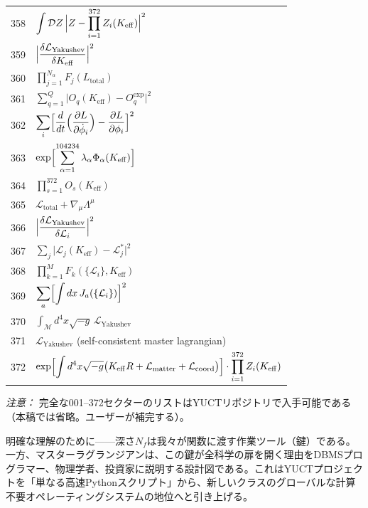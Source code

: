 \documentclass[11pt,a4paper]{article}
\begin{document}
\begin{longtable}{r p{}}
	358 & \(\displaystyle \int\mathcal{D}Z\,\Bigl|Z - \prod_{i=1}^{372}Z_i(K_{\mathrm{eff}})\Bigr|^2\) \\
	359 & \(\displaystyle \Bigl|\frac{\delta\mathcal{L}_{\text{Yakushev}}}{\delta K_{\mathrm{eff}}}\Bigr|^2\) \\
	360 & \(\displaystyle \prod_{j=1}^{N_\alpha}F_j(L_{\text{total}})\) \\
	361 & \(\displaystyle \sum_{q=1}^Q\bigl|O_q(K_{\mathrm{eff}}) - O_q^{\text{exp}}\bigr|^2\) \\
	362 & \(\displaystyle \sum_i\Bigl[\frac{d}{dt}\Bigl(\frac{\partial L}{\partial\dot\phi_i}\Bigr) - \frac{\partial L}{\partial\phi_i}\Bigr]^2\) \\
	363 & \(\displaystyle \exp\Bigl[\sum_{\alpha=1}^{104234}\lambda_\alpha\Phi_\alpha(K_{\mathrm{eff}})\Bigr]\) \\
	364 & \(\displaystyle \prod_{s=1}^{372}O_s(K_{\mathrm{eff}})\) \\
	365 & \(\displaystyle \mathcal{L}_{\text{total}} + \nabla_\mu\Lambda^\mu\) \\
	366 & \(\displaystyle \Bigl|\frac{\delta\mathcal{L}_{\text{Yakushev}}}{\delta\mathcal{L}_i}\Bigr|^2\) \\
	367 & \(\displaystyle \sum_j\bigl|\mathcal{L}_j(K_{\mathrm{eff}}) - \mathcal{L}_j^*\bigr|^2\) \\
	368 & \(\displaystyle \prod_{k=1}^M F_k(\{\mathcal{L}_i\},K_{\mathrm{eff}})\) \\
	369 & \(\displaystyle \sum_a\Bigl[\int dx\,J_a(\{\mathcal{L}_i\})\Bigr]^2\) \\
	370 & \(\displaystyle \int_{\mathcal{M}} d^4x\sqrt{-g}\,\mathcal{L}_{\text{Yakushev}}\) \\
	371 & \(\displaystyle \mathcal{L}_{\text{Yakushev}}\) (self-consistent master lagrangian) \\
	372 & \(\displaystyle \exp\Bigl[\int d^4x\sqrt{-g}\bigl(K_{\mathrm{eff}}R + \mathcal{L}_{\text{matter}} + \mathcal{L}_{\text{coord}}\bigr)\Bigr]\cdot\prod_{i=1}^{372}Z_i(K_{\mathrm{eff}})\) \\
	
\end{longtable}
	
	\textit{注意：} 完全な001–372セクターのリストはYUCTリポジトリで入手可能である（本稿では省略。ユーザーが補完する）。
	
	\small
	明確な理解のために——深さ\(N_{f}\)は我々が関数に渡す作業ツール（鍵）である。一方、マスターラグランジアンは、この鍵が全科学の扉を開く理由をDBMSプログラマー、物理学者、投資家に説明する設計図である。これはYUCTプロジェクトを「単なる高速Pythonスクリプト」から、新しいクラスのグローバルな計算不要オペレーティングシステムの地位へと引き上げる。
	
\end{document}

